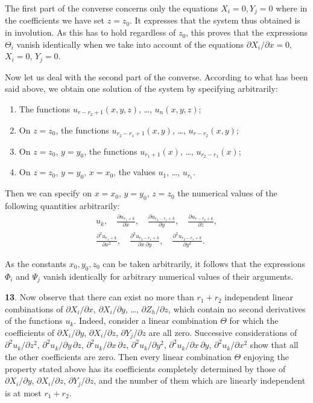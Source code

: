 \documentclass[leqno,11pt]{article}
\newcommand{\pd}{\partial}
\theoremstyle{shape1}
\theoremstyle{shape0}
\theoremstyle{shape2}
\theoremstyle{definition}
\begin{document}
The first part of the converse concerns only the equations $X_{i}=0, Y_{j}=0$ where in the coefficients we have set $z=z_{0}$. It expresses that the system thus obtained is in involution. As this has to hold regardless of $z_{0}$, this proves that the expressions $\Theta_{i}$ vanish identically when we take into account of the equations $\pd X_{i}/\pd x=0$, $X_{i}=0$, $Y_{j}=0$.

Now let us deal with the second part of the converse. According to what has been said above, we obtain one solution of the system by specifying arbitrarily:
\begin{enumerate}
\item The functions $u_{r-r_{2}+1}(x,y,z)$, \dots , $u_{n}(x,y,z)$;
\item On $z=z_{0}$, the functions $u_{r_{2}-r_{1}+1}(x,y)$, \dots , $u_{r-r_{2}}(x,y)$;
\item On $z=z_{0}$, $y=y_{0}$, the functions $u_{r_{1}+1}(x)$, \dots , $u_{r_{2}-r_{1}}(x)$;
\item On $z=z_{0}$, $y=y_{0}$, $x=x_{0}$, the values $u_{1}$, \dots , $u_{r_{1}}$.
\end{enumerate}

Then we can specify on $x=x_{0}$, $y=y_{0}$, $z=z_{0}$ the numerical values of the following quantities arbitrarily:
\begin{gather*}
  u_{k},\quad \frac{\pd u_{r_{1}+k}}{\pd x},\quad\frac{\pd u_{r_{2}-r_{1}+k}}{\pd y},\quad\frac{\pd u_{r-r_{2}+k}}{\pd z},\\
  \frac{\pd ^{2}u_{r_{1}+k}}{\pd x^{2}},\quad\frac{\pd^{2}u_{r_{2}-r_{1}+k}}{\pd x\,\pd y},\quad\frac{\pd ^{2}u_{r_{2}-r_{1}+k}}{\pd y^{2}}.
\end{gather*}

As the constants $x_{0},y_{0},z_{0}$ can be taken arbitrarily, it follows that the expressions $\Phi_{i}$ and $\Psi_{j}$ vanish identically for arbitrary numerical values of their arguments.

\vspace{12pt}

\textbf{13}. Now observe that there can exist no more than $r_{1}+r_{2}$ independent linear combinations of $\pd X_{i}/\pd x$, $\pd X_{i}/\pd y$, \dots , $\pd Z_{h}/\pd z$, which contain no second derivatives of the functions $u_{k}$. Indeed, consider a linear combination $\Theta$ for which the coefficients of $\pd X_{i}/\pd y$, $\pd X_{i}/\pd z$, $\pd Y_{j}/\pd z$ are all zero. Successive considerations of $\pd^{2}u_{k}/\pd z^{2}$, $\pd^{2}u_{k}/\pd y\,\pd z$, $\pd^{2}u_{k}/\pd x\, \pd z$, $\pd^{2}u_{k}/\pd y^{2}$, $\pd^{2}u_{k}/\pd x\,\pd y$, $\pd^{2}u_{k}/\pd x^{2}$ show that all the other coefficients are zero. Then every linear combination $\Theta$ enjoying the property stated above has its coefficients completely determined by those of $\pd X_{i}/\pd y$, $\pd X_{i}/\pd z$, $\pd Y_{j}/\pd z$, and the number of them which are linearly independent is at most $r_{1}+r_{2}$.
\end{document}
